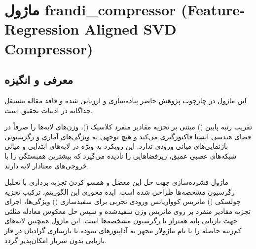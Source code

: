 \section{ماژول frandi\_compressor (Feature-Regression Aligned SVD Compressor)}
\label{sec:module_frandi_compressor}

\subsection{معرفی و انگیزه}
این ماژول در چارچوب پژوهش حاضر پیاده‌سازی و ارزیابی شده و فاقد مقاله مستقل جداگانه در ادبیات تحقیق است.

تقریب رتبه پایین () مبتنی بر تجزیه مقادیر منفرد کلاسیک ()، وزن‌های لایه‌ها را صرفاً در فضای هندسی ایستا فاکتورگیری می‌کند و هیچ توجهی به ویژگی‌های آماری و رگرسیونی بازنمایی‌های میانی ورودی ندارد. این رویکرد به ویژه در لایه‌های ابتدایی و میانی شبکه‌های عصبی عمیق، زیرفضاهایی را نادیده می‌گیرد که بیشترین همبستگی را با خروجی‌های معنادار لایه دارند.

ماژول فشرده‌سازی  جهت حل این معضل و همسو کردن تجزیه برداری با تحلیل رگرسیون مشخصه‌ها طراحی شده است. ایده محوری این الگوریتم، ترکیب تجزیه چولسکی () ماتریس کوواریانس ورودی تجربی برای سفیدسازی () ویژگی‌ها، اجرای تجزیه مقادیر منفرد بر روی ماتریس وزن سفیدشده و سپس حل معکوس معادله مثلثی جهت بازیابی پایه همتراز با رگرسیون مشخصه‌ها است. این ماژول همچنین لایه‌های کم‌رتبه حاصله را با نام ماژولار  مجهز به آداپتورهای  نموده تا بازسازی گرادیان در فاز بازیابی بدون سربار امکان‌پذیر گردد.

